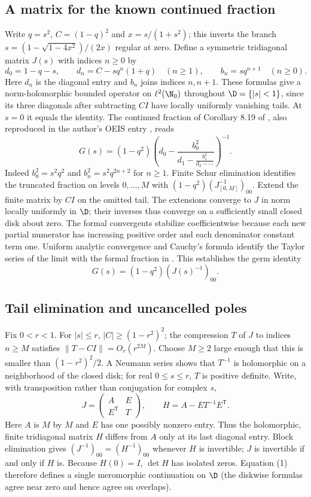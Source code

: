 \documentclass[11pt,a4paper]{article}
\numberwithin{equation}{section}
\theoremstyle{definition}
\theoremstyle{remark}
\begin{document}
\subsection*{A matrix for the known continued fraction}
Write $q=s^2$, $C=(1-q)^2$ and $x=s/(1+s^2)$; this inverts the
branch $s=(1-\sqrt{1-4x^2})/(2x)$ regular at zero.
Define a symmetric tridiagonal matrix $J(s)$ with indices $n\ge0$ by
\[
 d_0=1-q-s,\qquad d_n=C-sq^n(1+q)\quad(n\ge1),\qquad
 b_n=sq^{n+1}\quad(n\ge0).
\]
Here $d_n$ is the diagonal entry and $b_n$ joins indices $n,n+1$.
These formulas give a norm-holomorphic bounded operator on
$\ell^2(\N_0)$ throughout $\D=\{|s|<1\}$, since its three diagonals
after subtracting $C I$ have locally uniformly vanishing tails.
At $s=0$ it equals the identity. The continued fraction of Corollary 8.19 of \cite{r41taisho:BCS}, also reproduced in the author's OEIS entry \cite{r41taisho:OEIS}, reads
\[
 G(s)=(1-q^2)\left(d_0-\frac{b_0^2}{
 d_1-\frac{b_1^2}{d_2-\cdots}}\right)^{-1}.
\]
Indeed $b_0^2=s^2q^2$ and $b_n^2=s^2q^{2n+2}$ for $n\ge1$.
Finite Schur elimination identifies the truncated fraction on levels
$0,\ldots,M$ with $(1-q^2)(J_{[0,M]}^{-1})_{00}$.
Extend the finite matrix by $CI$ on the omitted tail. The extensions
converge to $J$ in norm locally uniformly in $\D$; their inverses thus
converge on a sufficiently small closed disk about zero. The formal
convergents stabilize coefficientwise because each new partial
numerator has increasing positive order and each denominator constant
term one. Uniform analytic convergence and Cauchy's formula identify
the Taylor series of the limit with the formal fraction in \cite{r41taisho:BCS}.
This establishes the germ identity
\[
 G(s)=(1-q^2)(J(s)^{-1})_{00}.
 \tag{1}
\]

\subsection*{Tail elimination and uncancelled poles}
Fix $0<r<1$. For $|s|\le r$, $|C|\ge (1-r^2)^2$;
the compression $T$ of $J$ to indices $n\ge M$ satisfies
$\|T-C I\|=O_r(r^{2M})$. Choose $M\ge2$ large enough that
this is smaller than $(1-r^2)^2/2$. A Neumann series shows that
$T^{-1}$ is holomorphic on a neighborhood of the closed disk; for real
$0\le s\le r$, $T$ is positive definite. Write, with transposition
rather than conjugation for complex $s$,
\[
 J=\begin{pmatrix}A&E\\E^{\mathsf T}&T\end{pmatrix},
 \qquad H=A-E T^{-1}E^{\mathsf T}.
\]
Here $A$ is $M$ by $M$ and $E$ has one possibly nonzero entry.
Thus the holomorphic, finite tridiagonal matrix $H$ differs from $A$
only at its last diagonal entry. Block elimination gives
$(J^{-1})_{00}=(H^{-1})_{00}$ whenever $H$ is invertible;
$J$ is invertible if and only if $H$ is. Because $H(0)=I$,
$\det H$ has isolated zeros. Equation (1) therefore defines a single
meromorphic continuation on $\D$ (the diskwise formulas agree near
zero and hence agree on overlaps).
\end{document}
